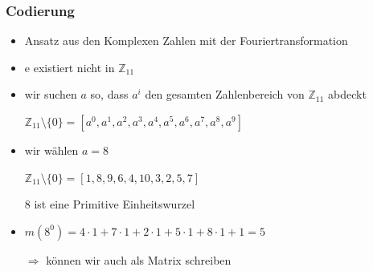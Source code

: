 \documentclass[11pt,aspectratio=169]{beamer}
\begin{document}
	\begin{frame}
		\frametitle{Codierung}
		
		\begin{itemize}
			\item Ansatz aus den Komplexen Zahlen mit der Fouriertransformation
			
			\vspace{10pt}
			
			\item $\mathrm{e}$ existiert nicht in $\mathbb{Z}_{11}$
			
			\vspace{10pt}
			
			\item wir suchen $a$ so, dass $a^i$ den gesamten Zahlenbereich von $\mathbb{Z}_{11}$ abdeckt
			
			$\mathbb{Z}_{11}\setminus\{0\} = [a^0, a^1, a^2, a^3, a^4, a^5, a^6, a^7, a^8, a^9]$
			
			\vspace{10pt}
			
			\item wir wählen $a = 8$
			
			$\mathbb{Z}_{11}\setminus\{0\} = [1,8,9,6,4,10,3,2,5,7]$
			
			8 ist eine Primitive Einheitswurzel
			
			\vspace{10pt}
			
			\item $m(8^0) = 4\cdot1 + 7\cdot1 + 2\cdot1 + 5\cdot1 + 8\cdot1 + 1 = 5$
			
			$\Rightarrow$ \qquad können wir auch als Matrix schreiben
			
		\end{itemize}
		
	\end{frame}
\end{document}
